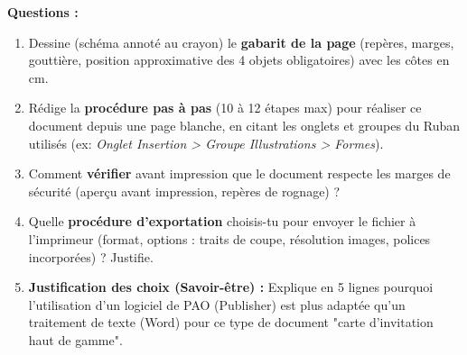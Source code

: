 \documentclass[11pt]{article}
\begin{document}
\begin{exercice}
\textbf{Questions :}
\begin{enumerate}
    \item Dessine (schéma annoté au crayon) le \textbf{gabarit de la page} (repères, marges, gouttière, position approximative des 4 objets obligatoires) avec les côtes en cm.
    \item Rédige la \textbf{procédure pas à pas} (10 à 12 étapes max) pour réaliser ce document depuis une page blanche, en citant les onglets et groupes du Ruban utilisés (ex: \textit{Onglet Insertion > Groupe Illustrations > Formes}).
    \item Comment \textbf{vérifier} avant impression que le document respecte les marges de sécurité (aperçu avant impression, repères de rognage) ?
    \item Quelle \textbf{procédure d'exportation} choisis-tu pour envoyer le fichier à l'imprimeur (format, options : traits de coupe, résolution images, polices incorporées) ? Justifie.
    \item \textbf{Justification des choix (Savoir-être) :} Explique en 5 lignes pourquoi l'utilisation d'un logiciel de PAO (Publisher) est plus adaptée qu'un traitement de texte (Word) pour ce type de document "carte d'invitation haut de gamme".
\end{enumerate}
\end{exercice}
\end{document}
